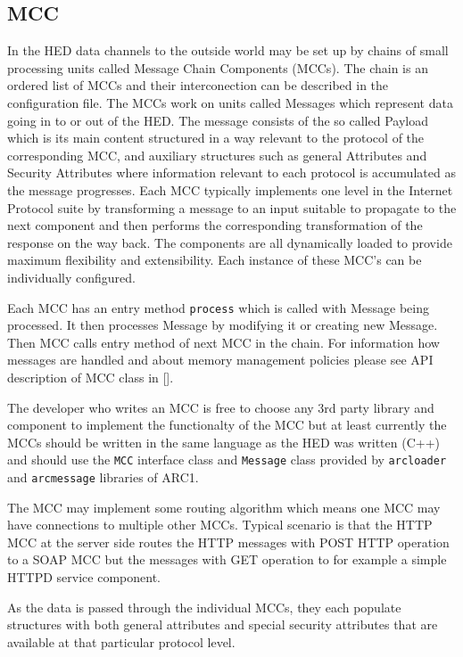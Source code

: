 \documentclass{book}
\begin{document}
\subsection{MCC}

In the HED data channels to the outside world may be set up by chains of small processing units called Message Chain Components (MCCs). The chain is an ordered list of MCCs and their interconection can be described in the configuration file. The MCCs work on units called Messages which represent data going in to or out of the HED. The message consists of the so called Payload which is its main content structured in a way relevant to the protocol of the corresponding MCC, and auxiliary structures such as general Attributes and Security Attributes where information relevant to each protocol is accumulated as the message progresses. Each MCC typically implements one level in the Internet Protocol suite by transforming a message to an input suitable to propagate to the next component and then performs the corresponding transformation of the response on the way back. The components are all dynamically loaded to provide maximum flexibility and extensibility. Each instance of these MCC's can be individually configured.

Each MCC has an entry method \texttt{process} which is called with Message being processed. It then processes Message by modifying it or creating new Message. Then MCC calls entry method of next MCC in the chain. For information how messages are handled and about memory management policies please see API description of MCC class in [].

The developer who writes an MCC is free to choose any 3rd party library and component to implement the functionalty of the MCC but at least currently the MCCs should be written in the same language as the HED was written (C++) and should use the \texttt{MCC} interface class and \texttt{Message} class provided by \texttt{arcloader} and \texttt{arcmessage} libraries of ARC1.

The MCC may implement some routing algorithm which means one MCC may have connections to multiple other MCCs. Typical scenario is that the HTTP MCC at the server side routes the HTTP messages with POST HTTP operation to a SOAP MCC but the messages with GET operation to for example a simple HTTPD service component.

As the data is passed through the individual MCCs, they each populate structures with both general attributes and special security attributes that are available at that particular protocol level.
\end{document}

